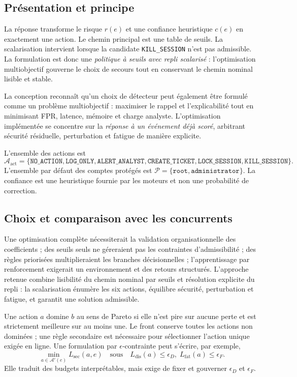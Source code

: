 \documentclass[11pt,a4paper,oneside]{report}
\theoremstyle{definition}
\theoremstyle{plain}
\begin{document}
\subsection*{Présentation et principe}

La réponse transforme le risque $r(e)$ et une confiance heuristique $c(e)$ en
exactement une action. Le chemin principal est une table de seuils. La scalarisation
intervient lorsque la candidate \texttt{KILL\_SESSION} n'est pas admissible. La
formulation est donc une \emph{politique à seuils avec repli scalarisé} :
l'optimisation multiobjectif gouverne le choix de secours tout en conservant le
chemin nominal lisible et stable.

La conception reconnaît qu'un choix de détecteur peut également être formulé
comme un problème multiobjectif : maximiser le rappel et l'explicabilité tout en
minimisant FPR, latence, mémoire et charge analyste. L'optimisation implémentée
se concentre sur la \emph{réponse à un événement déjà scoré}, arbitrant
sécurité résiduelle, perturbation et fatigue de manière explicite.

L'ensemble des actions est
\[
\mathcal{A}_{\mathrm{act}}=
\{\texttt{NO\_ACTION},\texttt{LOG\_ONLY},\texttt{ALERT\_ANALYST},
\texttt{CREATE\_TICKET},\texttt{LOCK\_SESSION},\texttt{KILL\_SESSION}\}.
\]
L'ensemble par défaut des comptes protégés est
$\mathcal{P}=\{\texttt{root},\texttt{administrator}\}$. La confiance est une heuristique fournie par les moteurs et non une probabilité de correction.

\subsection*{Choix et comparaison avec les concurrents}

Une optimisation complète nécessiterait la validation organisationnelle des
coefficients ; des seuils seuls ne géreraient pas les contraintes d'admissibilité ;
des règles priorisées multiplieraient les branches décisionnelles ; l'apprentissage
par renforcement exigerait un environnement et des retours structurés. L'approche
retenue combine lisibilité du chemin nominal par seuils et résolution explicite
du repli : la scalarisation énumère les six actions, équilibre sécurité,
perturbation et fatigue, et garantit une solution admissible.

Une action $a$ domine $b$ au sens de Pareto si elle n'est pire sur aucune perte
et est strictement meilleure sur au moins une. Le front conserve toutes les
actions non dominées ; une règle secondaire est nécessaire pour sélectionner
l'action unique exigée en ligne. Une formulation par $\epsilon$-contrainte peut
s'écrire, par exemple,
\begin{equation}
\min_{a\in\mathcal{A}'(e)} L_{\mathrm{sec}}(a,e)
\quad\text{sous}\quad
L_{\mathrm{dis}}(a)\leq\epsilon_D,\;
L_{\mathrm{fat}}(a)\leq\epsilon_F.
\label{eq:ai-ro-epsilon}
\end{equation}
Elle traduit des budgets interprétables, mais exige de fixer et gouverner
$\epsilon_D$ et $\epsilon_F$.
\end{document}
